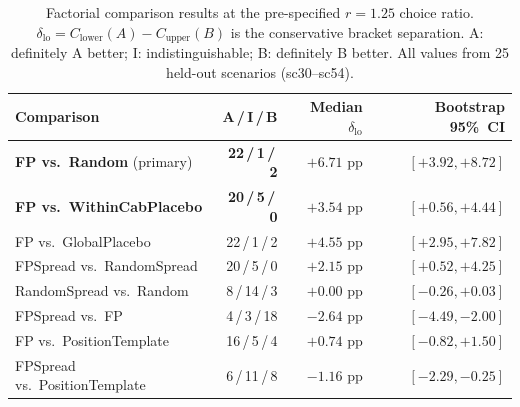 \begin{table}[t]
\caption{Factorial comparison results at the pre-specified $r=1.25$ choice ratio.
$\delta_{\mathrm{lo}} = C_{\mathrm{lower}}(A) - C_{\mathrm{upper}}(B)$ is the
conservative bracket separation. A: definitely A better; I: indistinguishable;
B: definitely B better. All values from 25 held-out scenarios (sc30--sc54).}
\label{tab:factorial}
\centering
\begin{tabular}{lrrr}
\toprule
Comparison & A\,/\,I\,/\,B & Median $\delta_{\mathrm{lo}}$ & Bootstrap 95\%~CI \\
\midrule
\textbf{FP vs.\ Random} (primary)        & \textbf{22\,/\,1\,/\,2}  & $+6.71$ pp & $[{+}3.92, {+}8.72]$ \\
\textbf{FP vs.\ WithinCabPlacebo}        & \textbf{20\,/\,5\,/\,0}  & $+3.54$ pp & $[{+}0.56, {+}4.44]$ \\
FP vs.\ GlobalPlacebo                    & 22\,/\,1\,/\,2            & $+4.55$ pp & $[{+}2.95, {+}7.82]$ \\
FPSpread vs.\ RandomSpread               & 20\,/\,5\,/\,0            & $+2.15$ pp & $[{+}0.52, {+}4.25]$ \\
RandomSpread vs.\ Random                 & 8\,/\,14\,/\,3            & $+0.00$ pp & $[{-}0.26, {+}0.03]$ \\
FPSpread vs.\ FP                         & 4\,/\,3\,/\,18            & $-2.64$ pp & $[{-}4.49, {-}2.00]$ \\
FP vs.\ PositionTemplate                 & 16\,/\,5\,/\,4            & $+0.74$ pp & $[{-}0.82, {+}1.50]$ \\
FPSpread vs.\ PositionTemplate           & 6\,/\,11\,/\,8            & $-1.16$ pp & $[{-}2.29, {-}0.25]$ \\
\bottomrule
\end{tabular}
\end{table}

